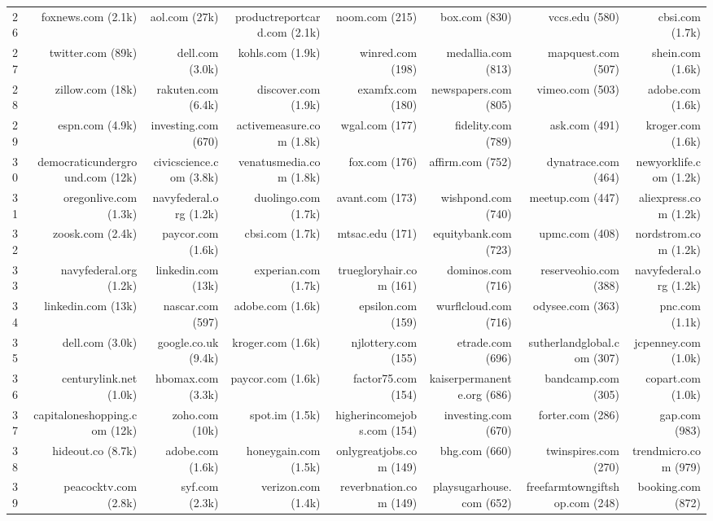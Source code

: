 \begin{table}
{\begin{tabular}[t]{lrrrrrrr}
26 & foxnews.com (2.1k) & aol.com (27k) & productreportcard.com (2.1k) & noom.com (215) & box.com (830) & vccs.edu (580) & cbsi.com (1.7k)\\
27 & twitter.com (89k) & dell.com (3.0k) & kohls.com (1.9k) & winred.com (198) & medallia.com (813) & mapquest.com (507) & shein.com (1.6k)\\
28 & zillow.com (18k) & rakuten.com (6.4k) & discover.com (1.9k) & examfx.com (180) & newspapers.com (805) & vimeo.com (503) & adobe.com (1.6k)\\
29 & espn.com (4.9k) & investing.com (670) & activemeasure.com (1.8k) & wgal.com (177) & fidelity.com (789) & ask.com (491) & kroger.com (1.6k)\\
30 & democraticunderground.com (12k) & civicscience.com (3.8k) & venatusmedia.com (1.8k) & fox.com (176) & affirm.com (752) & dynatrace.com (464) & newyorklife.com (1.2k)\\
31 & oregonlive.com (1.3k) & navyfederal.org (1.2k) & duolingo.com (1.7k) & avant.com (173) & wishpond.com (740) & meetup.com (447) & aliexpress.com (1.2k)\\
32 & zoosk.com (2.4k) & paycor.com (1.6k) & cbsi.com (1.7k) & mtsac.edu (171) & equitybank.com (723) & upmc.com (408) & nordstrom.com (1.2k)\\
33 & navyfederal.org (1.2k) & linkedin.com (13k) & experian.com (1.7k) & truegloryhair.com (161) & dominos.com (716) & reserveohio.com (388) & navyfederal.org (1.2k)\\
34 & linkedin.com (13k) & nascar.com (597) & adobe.com (1.6k) & epsilon.com (159) & wurflcloud.com (716) & odysee.com (363) & pnc.com (1.1k)\\
35 & dell.com (3.0k) & google.co.uk (9.4k) & kroger.com (1.6k) & njlottery.com (155) & etrade.com (696) & sutherlandglobal.com (307) & jcpenney.com (1.0k)\\
36 & centurylink.net (1.0k) & hbomax.com (3.3k) & paycor.com (1.6k) & factor75.com (154) & kaiserpermanente.org (686) & bandcamp.com (305) & copart.com (1.0k)\\
37 & capitaloneshopping.com (12k) & zoho.com (10k) & spot.im (1.5k) & higherincomejobs.com (154) & investing.com (670) & forter.com (286) & gap.com (983)\\
38 & hideout.co (8.7k) & adobe.com (1.6k) & honeygain.com (1.5k) & onlygreatjobs.com (149) & bhg.com (660) & twinspires.com (270) & trendmicro.com (979)\\
39 & peacocktv.com (2.8k) & syf.com (2.3k) & verizon.com (1.4k) & reverbnation.com (149) & playsugarhouse.com (652) & freefarmtowngiftshop.com (248) & booking.com (872)\\

\end{tabular}}
\end{table}
